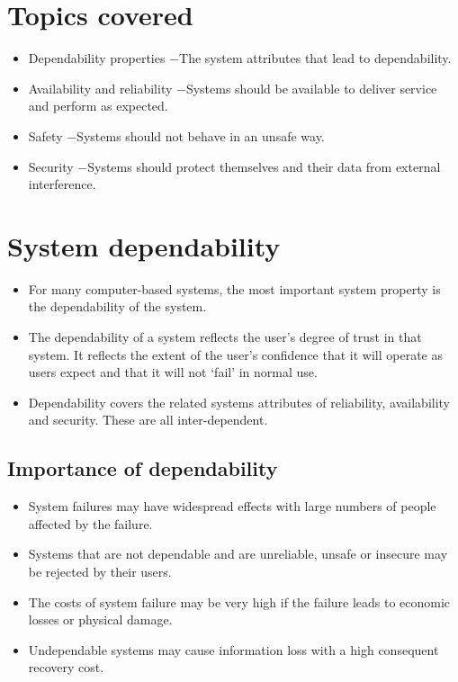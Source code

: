 \section{Topics covered}
\begin{itemize}

\item Dependability properties
\newline $-$The system attributes that lead to dependability.
\item Availability and reliability
\newline $-$Systems should be available to deliver service and perform as expected.
\item Safety
\newline $-$Systems should not behave in an unsafe way.
\item Security
\newline $-$Systems should protect themselves and their data from external interference.

\end{itemize}

\section{System dependability}
\begin{itemize}
\item For many computer-based systems, the most important system property is the dependability of the system.

\item The dependability of a system reflects the user’s degree of trust in that system. It reflects the extent of the user’s confidence that it will operate as users expect and that it will not ‘fail’ in normal use.

\item Dependability covers the related systems attributes of reliability, availability and security. These are all inter-dependent.
\end{itemize}

\subsection{Importance of dependability}
\begin{itemize}
\item System failures may have widespread effects with large numbers of people affected by the failure.
\item Systems that are not dependable and are unreliable, unsafe or insecure may be rejected by their users.
\item The costs of system failure may be very high if the failure leads to economic losses or physical damage.
\item Undependable systems may cause information loss with a high consequent recovery cost.
\end{itemize}

